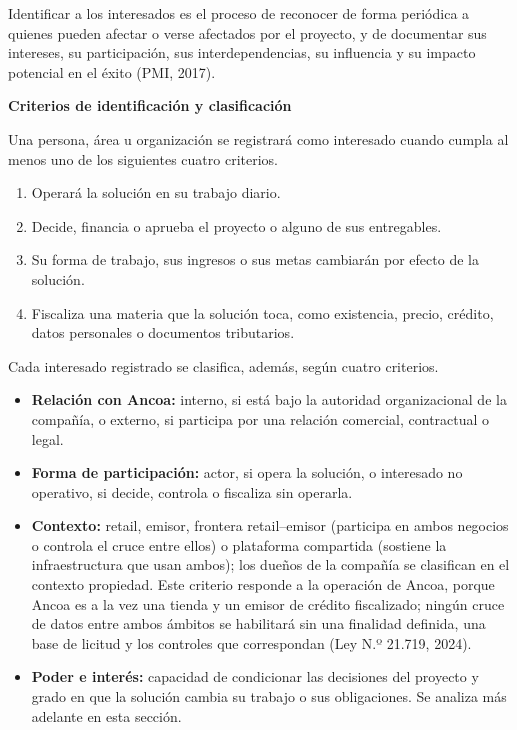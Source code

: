 \documentclass[11pt]{article}
\begin{document}
Identificar a los interesados es el proceso de reconocer de forma periódica a quienes pueden afectar o verse afectados por el proyecto, y de documentar sus intereses, su participación, sus interdependencias, su influencia y su impacto potencial en el éxito (PMI, 2017).

\textbf{Criterios de identificación y clasificación}

Una persona, área u organización se registrará como interesado cuando
cumpla al menos uno de los siguientes cuatro criterios.

\begin{enumerate}
\def\labelenumi{\arabic{enumi}.}
\item
  Operará la solución en su trabajo diario.
\item
  Decide, financia o aprueba el proyecto o alguno de sus entregables.
\item
  Su forma de trabajo, sus ingresos o sus metas cambiarán por efecto de
  la solución.
\item
  Fiscaliza una materia que la solución toca, como existencia, precio,
  crédito, datos personales o documentos tributarios.
\end{enumerate}

Cada interesado registrado se clasifica, además, según cuatro criterios.

\begin{itemize}
\item
  \textbf{Relación con Ancoa:} interno, si está bajo la autoridad
  organizacional de la compañía, o externo, si participa por una
  relación comercial, contractual o legal.
\item
  \textbf{Forma de participación:} actor, si opera la solución, o
  interesado no operativo, si decide, controla o fiscaliza sin operarla.
\item
  \textbf{Contexto:} retail, emisor, frontera retail--emisor (participa
  en ambos negocios o controla el cruce entre ellos) o plataforma
  compartida (sostiene la infraestructura que usan ambos); los dueños de
  la compañía se clasifican en el contexto propiedad. Este criterio
  responde a la operación de Ancoa, porque Ancoa es a la vez una tienda
  y un emisor de crédito fiscalizado; ningún cruce de datos entre ambos
  ámbitos se habilitará sin una finalidad definida, una base de licitud
  y los controles que correspondan (Ley N.º 21.719, 2024).
\item
  \textbf{Poder e interés:} capacidad de condicionar las decisiones del
  proyecto y grado en que la solución cambia su trabajo o sus
  obligaciones. Se analiza más adelante en esta sección.
\end{itemize}
\end{document}
